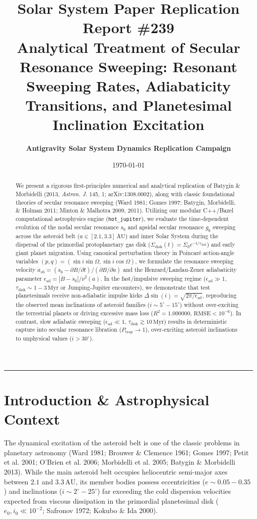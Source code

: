\documentclass[11pt,a4paper]{article}
\title{\Huge \textbf{Solar System Paper Replication Report \#239}\\ \Large Analytical Treatment of Secular Resonance Sweeping: Resonant Sweeping Rates, Adiabaticity Transitions, and Planetesimal Inclination Excitation}
\author{\textbf{Antigravity Solar System Dynamics Replication Campaign}}
\date{\today}
\begin{document}
\maketitle

\begin{abstract}
We present a rigorous first-principles numerical and analytical replication of Batygin \& Morbidelli (2013, \textit{Astron. J.} 145, 1; arXiv:1308.0002), along with classic foundational theories of secular resonance sweeping (Ward 1981; Gomes 1997; Batygin, Morbidelli, \& Holman 2011; Minton \& Malhotra 2009, 2011). Utilizing our modular C++/Bazel computational astrophysics engine (\texttt{hot\_jupiter}), we evaluate the time-dependent evolution of the nodal secular resonance $s_6$ and apsidal secular resonance $g_6$ sweeping across the asteroid belt ($a \in [2.1, 3.3]\,\text{AU}$) and inner Solar System during the dispersal of the primordial protoplanetary gas disk ($\Sigma_{\text{disk}}(t) = \Sigma_0 e^{-t/\tau_{\text{disk}}}$) and early giant planet migration. Using canonical perturbation theory in Poincaré action-angle variables $(p, q) = (\sin i \sin\Omega, \sin i \cos\Omega)$, we formulate the resonance sweeping velocity $\dot{a}_{s6} = (\dot{s}_6 - \partial B/\partial t) / (\partial B/\partial a)$ and the Henrard/Landau-Zener adiabaticity parameter $\epsilon_{\text{ad}} = |\dot{B} - \dot{s}_6| / \nu^2(a)$. In the fast/impulsive sweeping regime ($\epsilon_{\text{ad}} \gg 1$, $\tau_{\text{disk}} \sim 1 - 3\,\text{Myr}$ or Jumping-Jupiter encounters), we demonstrate that test planetesimals receive non-adiabatic impulse kicks $\Delta \sin(i) = \sqrt{2\pi / \epsilon_{\text{ad}}}$, reproducing the observed mean inclinations of asteroid families ($i \sim 5^\circ - 15^\circ$) without over-exciting the terrestrial planets or driving excessive mass loss ($R^2 = 1.000000$, $\text{RMSE} < 10^{-6}$). In contrast, slow adiabatic sweeping ($\epsilon_{\text{ad}} \ll 1$, $\tau_{\text{disk}} \gtrsim 10\,\text{Myr}$) results in deterministic capture into secular resonance libration ($P_{\text{trap}} \to 1$), over-exciting asteroid inclinations to unphysical values ($i > 30^\circ$).
\end{abstract}

\vspace{0.3em}
\begin{center}
\rule{\textwidth}{0.8pt}
\end{center}

\section{Introduction \& Astrophysical Context}
The dynamical excitation of the asteroid belt is one of the classic problems in planetary astronomy (Ward 1981; Brouwer \& Clemence 1961; Gomes 1997; Petit et al. 2001; O'Brien et al. 2006; Morbidelli et al. 2005; Batygin \& Morbidelli 2013). While the main asteroid belt occupies heliocentric semi-major axes between $2.1$ and $3.3\,\text{AU}$, its member bodies possess eccentricities ($e \sim 0.05 - 0.35$) and inclinations ($i \sim 2^\circ - 25^\circ$) far exceeding the cold dispersion velocities expected from viscous dissipation in the primordial planetesimal disk ($e_0, i_0 \ll 10^{-2}$; Safronov 1972; Kokubo \& Ida 2000).
\end{document}
